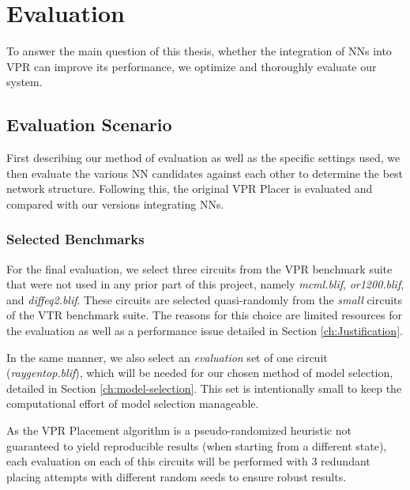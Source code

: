 
\chapter{Evaluation}\label{ch:evaluation}
\glsresetall %

To answer the main question of this thesis, whether the integration of \glspl{NN} into \gls{VPR} can improve its performance, we optimize and thoroughly evaluate our system.

\section{Evaluation Scenario}

First describing our method of evaluation as well as the specific settings used, we then evaluate the various \gls{NN} candidates against each other to determine the best network structure. Following this, the original \gls{VPR} Placer is evaluated and compared with our versions integrating \glspl{NN}.

\subsection{Selected Benchmarks}\label{ch:benchmarks}

For the final evaluation, we select three circuits from the \gls{VPR} benchmark suite that were not used in any prior part of this project, namely \textit{mcml.blif}, \textit{or1200.blif}, and \textit{diffeq2.blif}. These circuits are selected quasi-randomly from the \textit{small} circuits of the \gls{VTR} benchmark suite. The reasons for this choice are limited resources for the evaluation as well as a performance issue detailed in Section \ref{ch:Justification}.

In the same manner, we also select an \textit{evaluation} set of one circuit (\textit{raygentop.blif}), which will be needed for our chosen method of model selection, detailed in Section \ref{ch:model-selection}. This set is intentionally small to keep the computational effort of model selection manageable.

As the \gls{VPR} Placement algorithm is a pseudo-randomized heuristic not guaranteed to yield reproducible results (when starting from a different state), each evaluation on each of this circuits will be performed with 3 redundant placing attempts with different random seeds to ensure robust results. 

